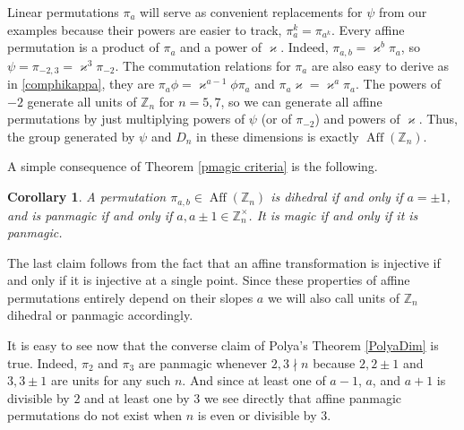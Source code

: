 \documentclass[11pt]{article}
\theoremstyle{plain}
\newtheorem{corollary}{Corollary}
\theoremstyle{definition}
\newcommand{\+}[1]{{#1}^\times}
\def\Aff{\operatorname{Aff}}
\def\Z{{\mathbb Z}}
\def\k{{\varkappa}}
\begin{document}
Linear permutations $\pi_a$ will serve as convenient replacements for $\psi$ from our examples because their powers are easier to track, $\pi_a^k=\pi_{a^k}$. Every affine permutation is a product of $\pi_a$ and a power of $\k$. Indeed, $\pi_{a,b}=\k^b\pi_a$, so $\psi=\pi_{-2,3}=\k^3\pi_{-2}$. The commutation relations for $\pi_a$ are also easy to derive as in \eqref{comphikappa}, they are $\pi_a\phi=\k^{a-1}\phi\pi_a$ and $\pi_a\k=\k^a\pi_a$. The powers of $-2$ generate all units of $\Z_n$ for $n=5,7$, so we can generate all affine permutations by just multiplying powers of $\psi$ (or of $\pi_{-2}$) and powers of $\k$. Thus, the group generated by $\psi$ and $D_n$ in these dimensions is exactly  $\Aff(\Z_n)$. 

A simple consequence of Theorem \ref{pmagic criteria} is the following.
\begin{corollary}\label{AfPmag} A permutation $\pi_{a,b}\in \Aff(\Z_n)$ is dihedral if and only if $a=\pm1$, and is panmagic if and only if $a,a\pm1\in\+{\Z}_n$. It is magic if and only if it is panmagic.
\end{corollary}
\noindent The last claim follows from the fact that an affine transformation is injective if and only if it is injective at a single point. Since these properties of affine permutations entirely depend on their slopes $a$ we will also call units of $\Z_n$ dihedral or panmagic accordingly. 

It is easy to see now that the converse claim of Polya's Theorem \ref{PolyaDim} is true. Indeed, $\pi_2$ and $\pi_3$ are panmagic whenever $2,3\nmid n$ because $2,2\pm1$ and $3,3\pm1$ are units for any such $n$. And since at least one of $a-1$, $a$, and $a+1$ is divisible by $2$ and at least one by $3$ we see directly that affine panmagic permutations do not exist when $n$ is even or divisible by $3$. 
\end{document}
